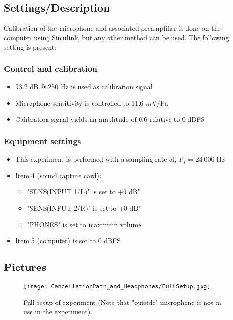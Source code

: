 \subsection{Settings/Description}
\label{SettingsCacellationPath}

Calibration of the microphone and associated preamplifier is done on the computer using Simulink\textsuperscript{\textregistered}, but any other method can be used. The following setting is present:

\subsubsection{Control and calibration}
\begin{itemize}
	\item 93.2 dB $@$ 250 Hz is used as calibration signal
	\item Microphone sensitivity is controlled to 11.6 $m$V/Pa
	\item Calibration signal yields an amplitude of 0.6 relative to 0 dBFS
\end{itemize}

\subsubsection{Equipment settings}
\begin{itemize}
	\item This experiment is performed with a sampling rate of, $F_{s}$ = 24,000 Hz
	\item Item 4 (sound capture card):
		\begin{itemize}
			\item "SENS(INPUT 1/L)" is set to +0 dB"
			\item "SENS(INPUT 2/R)" is set to +0 dB"
			\item "PHONES" is set to maximum volume
		\end{itemize}		
	\item Item 5 (computer) is set to 0 dBFS
\end{itemize}


\subsection{Pictures}
\begin{figure}[H]
	\centering
	\texttt{[image: CancellationPath\_and\_Headphones/FullSetup.jpg]}
	\caption{Full setup of experiment (Note that "outside" microphone is not in use in the experiment).}
	\label{FullSetupCancellationPath}
\end{figure}

